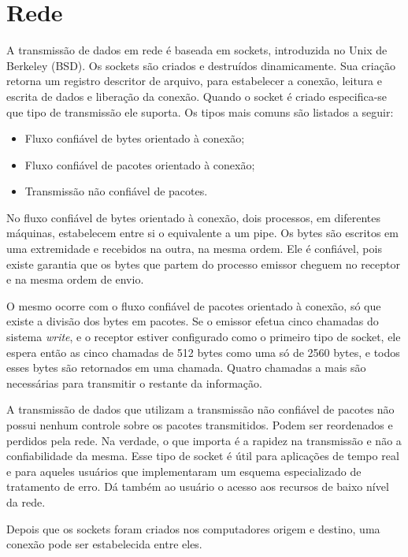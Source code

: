 \section{Rede}

A transmissão de dados em rede é baseada em sockets, introduzida no Unix de Berkeley (BSD). Os sockets são criados e destruídos dinamicamente. Sua criação retorna um registro descritor de arquivo, para estabelecer a conexão, leitura e escrita de dados e liberação da conexão. Quando o socket é criado especifica-se que tipo de transmissão ele suporta. Os tipos mais comuns são listados a seguir:

\begin{itemize}
\item Fluxo confiável de bytes orientado à conexão;
\item Fluxo confiável de pacotes orientado à conexão;
\item Transmissão não confiável de pacotes.
\end{itemize}

No fluxo confiável de bytes orientado à conexão, dois processos, em diferentes máquinas, estabelecem entre si o equivalente a um pipe. Os bytes são escritos em uma extremidade e recebidos na outra, na mesma ordem. Ele é confiável, pois existe garantia que os bytes que partem do processo emissor cheguem no receptor e na mesma ordem de envio.

O mesmo ocorre com o fluxo confiável de pacotes orientado à conexão, só que existe a divisão dos bytes em pacotes. Se o emissor efetua cinco chamadas do sistema \emph{write}, e o receptor estiver configurado como o primeiro tipo de socket, ele espera então as cinco chamadas de 512 bytes como uma só de 2560 bytes, e todos esses bytes são retornados em uma chamada. Quatro chamadas a mais são necessárias para transmitir o restante da informação.

A transmissão de dados que utilizam a transmissão não confiável de pacotes não possui nenhum controle sobre os pacotes transmitidos. Podem ser reordenados e perdidos pela rede. Na verdade, o que importa é a rapidez na transmissão e não a confiabilidade da mesma. Esse tipo de socket é útil para aplicações de tempo real e para aqueles usuários que implementaram um esquema especializado de tratamento de erro. Dá também ao usuário o acesso aos recursos de baixo nível da rede.

Depois que os sockets foram criados nos computadores origem e destino, uma conexão pode ser estabelecida entre eles.

